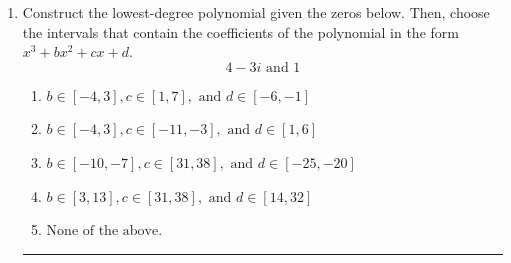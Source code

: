 \documentclass[14pt]{extbook}
\newcommand{\litem}[1]{\item#1\hspace*{-1cm}\rule{\textwidth}{0.4pt}}
\begin{document}
\begin{enumerate}
{\begin{enumerate}[label=\Alph*.]
\end{enumerate} }
\litem{
Construct the lowest-degree polynomial given the zeros below. Then, choose the intervals that contain the coefficients of the polynomial in the form $x^3+bx^2+cx+d$.\[ 4 - 3 i \text{ and } 1 \]\begin{enumerate}[label=\Alph*.]
\item \( b \in [-4, 3], c \in [1, 7], \text{ and } d \in [-6, -1] \)
\item \( b \in [-4, 3], c \in [-11, -3], \text{ and } d \in [1, 6] \)
\item \( b \in [-10, -7], c \in [31, 38], \text{ and } d \in [-25, -20] \)
\item \( b \in [3, 13], c \in [31, 38], \text{ and } d \in [14, 32] \)
\item \( \text{None of the above.} \)


\end{enumerate}}
\end{enumerate}
\end{document}
